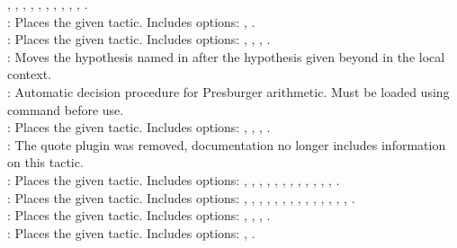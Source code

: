 	, , , , , 
	, , , , 
	, .  
\\
 : Places the given tactic. Includes options: 
	, . 
\\
 : Places the given tactic. Includes options: 
	, , , . 
\\
 : Moves the hypothesis named in  after the hypothesis given beyond 
	 in the local context. 
\\
 : Automatic decision procedure for Presburger arithmetic. 
	Must be loaded using command  before use. 
\\
 : Places the given tactic. Includes options: 
	, , , . 
\\
 : The quote plugin was removed, documentation no longer includes information on this tactic. 
\\
 : Places the given tactic. Includes options: 
	, , , , , , 
	, , , , 
	, , . 
\\
 : Places the given tactic. Includes options: 
	, , , , , 
	, , , , 
	, , , , , . 
\\
 : Places the given tactic. Includes options: 
	, , , . 
\\
 : Places the given tactic. Includes options: 
	, .  






	
~\\
